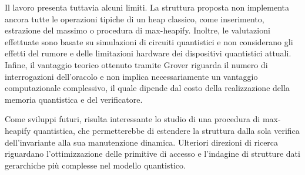 Il lavoro presenta tuttavia alcuni limiti. La struttura proposta non implementa ancora tutte le operazioni tipiche di un heap classico, come inserimento, estrazione del massimo o procedura di max-heapify. Inoltre, le valutazioni effettuate sono basate su simulazioni di circuiti quantistici e non considerano gli effetti del rumore e delle limitazioni hardware dei dispositivi quantistici attuali. Infine, il vantaggio teorico ottenuto tramite Grover riguarda il numero di interrogazioni dell'oracolo e non implica necessariamente un vantaggio computazionale complessivo, il quale dipende dal costo della realizzazione della memoria quantistica e del verificatore.

Come sviluppi futuri, risulta interessante lo studio di una procedura di max-heapify quantistica, che permetterebbe di estendere la struttura dalla sola verifica dell'invariante alla sua manutenzione dinamica. Ulteriori direzioni di ricerca riguardano l'ottimizzazione delle primitive di accesso e l'indagine di strutture dati gerarchiche più complesse nel modello quantistico.